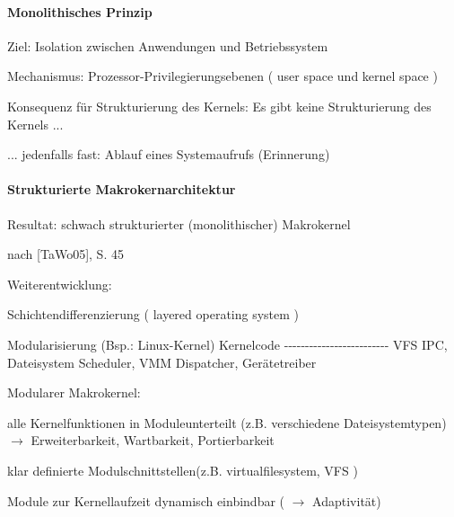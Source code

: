 \documentclass[a4paper]{article}
\begin{document}
\begin{multicols}{3}
    \paragraph{Monolithisches Prinzip}

    \begin{itemize*}
        \item
        Ziel: Isolation zwischen Anwendungen und Betriebssystem
        \item
        Mechanismus: Prozessor-Privilegierungsebenen ( user space und kernel
        space )
        \item
        Konsequenz für Strukturierung des Kernels: Es gibt keine
        Strukturierung des Kernels ...
        \item
        ... jedenfalls fast: Ablauf eines Systemaufrufs (Erinnerung)
    \end{itemize*}


    \paragraph{Strukturierte
        Makrokernarchitektur}

    \begin{itemize*}
        \item
        Resultat: schwach strukturierter (monolithischer) Makrokernel
        \item
        \begin{itemize*}
            \item nach {[}TaWo05{]}, S. 45
        \end{itemize*}
        \item
        Weiterentwicklung:
        \item
        Schichtendifferenzierung ( layered operating system )
        \item
        Modularisierung (Bsp.: Linux-Kernel) \textbar{} Kernelcode \textbar{}
        \textbar{}
        -\/-\/-\/-\/-\/-\/-\/-\/-\/-\/-\/-\/-\/-\/-\/-\/-\/-\/-\/-\/-\/-\/-\/-\/-
        \textbar{} \textbar{} VFS \textbar{} \textbar{} IPC, Dateisystem
        \textbar{} \textbar{} Scheduler, VMM \textbar{} \textbar{} Dispatcher,
        Gerätetreiber \textbar{}
        \item
        Modularer Makrokernel:
        \item
        alle Kernelfunktionen in Moduleunterteilt (z.B. verschiedene
        Dateisystemtypen) $\rightarrow$ Erweiterbarkeit,
        Wartbarkeit, Portierbarkeit
        \item
        klar definierte Modulschnittstellen(z.B. virtualfilesystem, VFS )
        \item
        Module zur Kernellaufzeit dynamisch einbindbar
        ( $\rightarrow$ Adaptivität)
    \end{itemize*}



\end{multicols}
\end{document}
